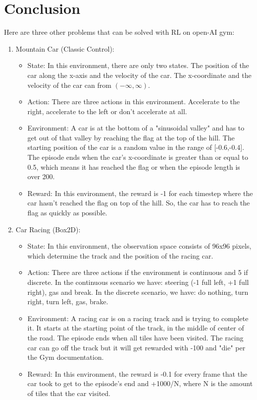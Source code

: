 \documentclass{article}
\numberwithin{equation}{section}
\numberwithin{equation}{section}
\begin{document}
\section*{Conclusion}
Here are three other problems that can be solved with RL on open-AI gym:

\begin{enumerate}
\item Mountain Car (Classic Control):
\begin{itemize}
\item State: In this environment, there are only two states. The position of the car along the x-axis and the velocity of the car. The x-coordinate and the velocity of the car can from $\left(-\infty, \infty\right)$.
\item Action: There are three actions in this environment. Accelerate to the right, accelerate to the left or don't accelerate at all.  
\item Environment: A car is at the bottom of a "sinusoidal valley" and has to get out of that valley by reaching the flag at the top of the hill. The starting position of the car is a random value in the range of [-0.6,-0.4]. The episode ends when the car's x-coordinate is greater than or equal to 0.5, which means it has reached the flag or when the episode length is over 200.
\item Reward: In this environment, the reward is -1 for each timestep where the car hasn't reached the flag on top of the hill. So, the car has to reach the flag as quickly as possible.  
\end{itemize}



\item Car Racing (Box2D): 
\begin{itemize}
\item State: In this environment, the observation space consists of 96x96 pixels, which determine the track and the position of the racing car.
\item Action: There are three actions if the environment is continuous and 5 if discrete. In the continuous scenario we have: steering (-1 full left, +1 full right), gas and break. In the discrete scenario, we have: do nothing, turn right, turn left, gas, brake.
\item Environment: A racing car is on a racing track and is trying to complete it. It starts at the starting point of the track, in the middle of center of the road. The episode ends when all tiles have been visited. The racing car can go off the track but it will get rewarded with -100 and "die" per the Gym documentation.
\item Reward: In this environment, the reward is -0.1 for every frame that the car took to get to the episode's end and +1000/N, where N is the amount of tiles that the car visited.
\end{itemize}










\end{enumerate}
\end{document}
